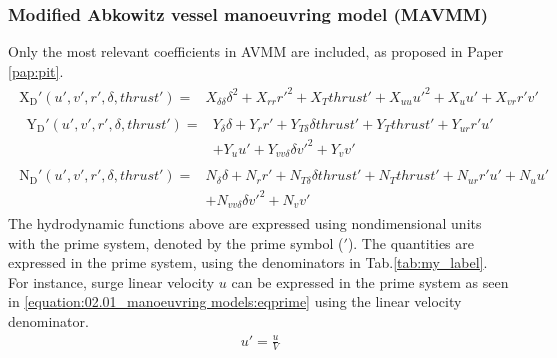 \subsubsection*{Modified Abkowitz vessel manoeuvring model (MAVMM)}
Only the most relevant coefficients in AVMM are included, as proposed in Paper \ref{pap:pit}.
\begin{equation}\label{equation:02.01_manoeuvring models:eqxmartinssimple}
\begin{split}\begin{split}
\operatorname{X_{D}'}{\left(u',v',r',\delta,thrust' \right)} = & X_{\delta\delta} \delta^{2} + X_{rr} r'^{2} + X_{T} thrust' + X_{uu} u'^{2} + X_{u} u' + X_{vr} r' v' 
\end{split}\end{split}
\end{equation}\begin{equation}\label{equation:02.01_manoeuvring models:eqymartinssimple}
\begin{split}\begin{split}
\operatorname{Y_{D}'}{\left(u',v',r',\delta,thrust' \right)} = & Y_{\delta} \delta + Y_{r} r' + Y_{T\delta} \delta thrust' + Y_{T} thrust' + Y_{ur} r' u' \\ & + Y_{u} u' + Y_{vv\delta} \delta v'^{2} + Y_{v} v' 
\end{split}\end{split}
\end{equation}\begin{equation}\label{equation:02.01_manoeuvring models:eqnmartinssimple}
\begin{split}\begin{split}
\operatorname{N_{D}'}{\left(u',v',r',\delta,thrust' \right)} = & N_{\delta} \delta + N_{r} r' + N_{T\delta} \delta thrust' + N_{T} thrust' + N_{ur} r' u' + N_{u} u' \\ & + N_{vv\delta} \delta v'^{2} + N_{v} v' 
\end{split}\end{split}
\end{equation}
\sphinxAtStartPar
The hydrodynamic functions above are expressed using nondimensional units with the prime system, denoted by the prime symbol (\('\)). The quantities are expressed in the prime system, using the denominators in Tab.\ref{tab:my_label}. For instance, surge linear velocity \(u\) can be expressed in the prime system as seen in \autoref{equation:02.01_manoeuvring models:eqprime} using the linear velocity denominator.
\begin{equation}\label{equation:02.01_manoeuvring models:eqprime}
\begin{split}\displaystyle u'=\frac{u}{V}\end{split}
\end{equation}
